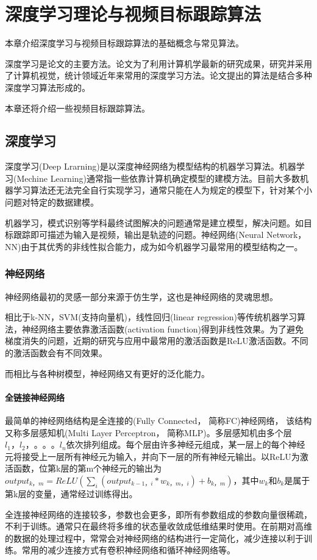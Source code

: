 
\chapter{深度学习理论与视频目标跟踪算法}
本章介绍深度学习与视频目标跟踪算法的基础概念与常见算法。
\par
深度学习是论文的主要方法。论文为了利用计算机学最新的研究成果，研究并采用了计算机视觉，统计领域近年来常用的深度学习方法。论文提出的算法是结合多种深度学习算法形成的。
\par
本章还将介绍一些视频目标跟踪算法。

\section{深度学习}
深度学习(Deep Lrarning)是以深度神经网络为模型结构的机器学习算法\supercite{deng2014deep}。机器学习(Mechine Learning)通常指一些依靠计算机确定模型的建模方法。目前大多数机器学习算法还无法完全自行实现学习，通常只能在人为规定的模型下，针对某个小问题对特定的数据建模。
\par
机器学习，模式识别等学科最终试图解决的问题通常是建立模型，解决问题。如目标跟踪即可描述为输入是视频，输出是轨迹的问题。神经网络(Neural Network， NN)由于其优秀的非线性拟合能力，成为如今机器学习最常用的模型结构之一。
\subsection{神经网络}
神经网络最初的灵感一部分来源于仿生学\supercite{mcculloch1943logical}\supercite{farley1954simulation}，这也是神经网络的灵魂思想。
\par
相比于k-NN，SVM(支持向量机)，线性回归(linear regression)等传统机器学习算法，神经网络主要依靠激活函数(activation function)得到非线性效果。为了避免梯度消失的问题，近期的研究与应用中最常用的激活函数是ReLU激活函数\supercite{krizhevsky2012imagenet}。不同的激活函数会有不同效果\supercite{karlik2011performance}。
\par
而相比与各种树模型，神经网络又有更好的泛化能力。
\par
\subsubsection{全链接神经网络}
\par
最简单的神经网络结构是全连接的(Fully Connected， 简称FC)神经网络， 该结构又称多层感知机(Multi Layer Perceptron， 简称MLP)。多层感知机由多个层$l_1，l_2，。。。l_n$依次排列组成。每个层由许多神经元组成，某一层上的每个神经元将接受上一层所有神经元为输入，并向下一层的所有神经元输出。以ReLU为激活函数，位第k层的第m个神经元的输出为$output_{k，m}=ReLU(\sum_{i} (output_{k-1，i}*w_{k，m，i})+b_{k，m})$，其中$w_{k}$和$b_{k}$是属于第k层的变量，通常经过训练得出。
\par
全连接神经网络的连接较多，参数也会更多，即所有参数组成的参数向量很稀疏，不利于训练。通常只在最终将多维的状态量收敛成低维结果时使用。在前期对高维的数据的处理过程中，常常会对神经网络的结构进行一定简化，减少连接以利于训练。常用的减少连接方式有卷积神经网络和循环神经网络等。
\par
